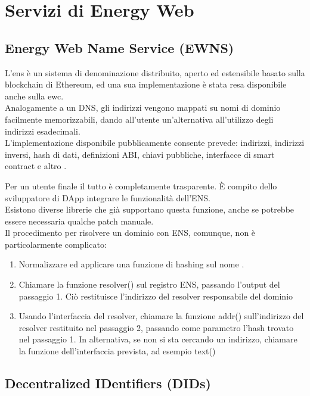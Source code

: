 \chapter{Servizi di Energy Web}

\section{Energy Web Name Service (EWNS)}
\label{sec:ewns}

L'\gls{ens} è un sistema di denominazione distribuito, aperto ed estensibile basato sulla blockchain di Ethereum, ed una sua implementazione è stata resa disponibile anche sulla \gls{ewc}. \\
Analogamente a un DNS, gli indirizzi vengono mappati su nomi di dominio facilmente memorizzabili, dando all'utente un'alternativa all'utilizzo degli indirizzi esadecimali. \\
L'implementazione disponibile pubblicamente consente prevede: indirizzi, indirizzi inversi, hash di dati, definizioni ABI, chiavi pubbliche, interfacce di smart contract e altro \cite{wiki:ewns}.

Per un utente finale il tutto è completamente trasparente.
È compito dello sviluppatore di DApp integrare le funzionalità dell'ENS. \\
Esistono diverse librerie che già supportano questa funzione, anche se potrebbe essere necessaria qualche patch manuale. \\
Il procedimento per risolvere un dominio con ENS, comunque, non è particolarmente complicato:

\begin{enumerate}
    \item Normalizzare ed applicare una funzione di hashing sul nome \cite{wiki:ens-normalize-name}.
    \item Chiamare la funzione resolver() sul registro ENS, passando l'output del passaggio 1. Ciò restituisce l'indirizzo del resolver responsabile del dominio
    \item Usando l'interfaccia del resolver, chiamare la funzione addr() sull'indirizzo del resolver restituito nel passaggio 2, passando come parametro l'hash trovato nel passaggio 1. In alternativa, se non si sta cercando un indirizzo, chiamare la funzione dell'interfaccia prevista, ad esempio text()
\end{enumerate}

\section{Decentralized IDentifiers (DIDs)}
\label{sec:did}

